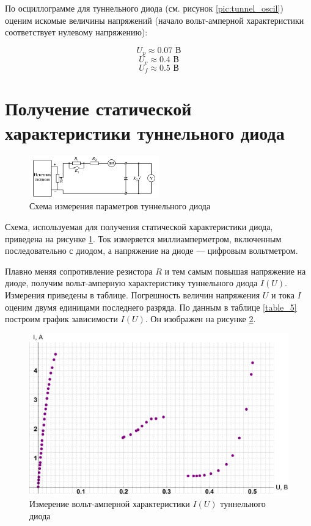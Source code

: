 \documentclass[12pt]{kiarticle}
\begin{document}
	
	
	По осциллограмме для туннельного диода (см. рисунок \ref{pic:tunnel_oscil}) оценим искомые величины напряжений (начало вольт-амперной характеристики соответствует нулевому напряжению): 
	
	\[ U_p \approx 0.07 \text{ В} \]
	\[ U_v \approx 0.4  \text{ В} \]
	\[ U_f \approx 0.5  \text{ В} \]
%	
%	
	
	
	\section{Получение статической характеристики туннельного диода}
	
		\begin{figure}[h]
		\centering	
		\includegraphics[width=0.5\textwidth]{scheme.png}
		\caption{Схема измерения параметров туннельного диода}
		\label{pic:scheme}
	\end{figure}
	
	Схема, используемая для получения статической характеристики диода, приведена на рисунке \ref{pic:scheme}. Ток измеряется миллиамперметром, включенным последовательно с диодом, а напряжение на диоде --- цифровым вольтметром. 
	
	Плавно меняя сопротивление резистора $ R $ и тем самым повышая напряжение на диоде, получим вольт-амперную характеристику туннельного диода $I(U)$.  Измерения приведены в таблице. Погрешность величин напряжения $U$ и тока $I$ оценим двумя единицами последнего разряда. По данным в таблице \ref{table_5} построим график зависимости $I(U)$. Он изображен на рисунке \ref{graf}. 
	
	\begin{figure}[h]
		\includegraphics[scale=0.47]{graf.pdf}
		\caption{Измерение вольт-амперной характеристики $I(U)$ туннельного диода}
		\label{graf}
	\end{figure}
	
\end{document}
